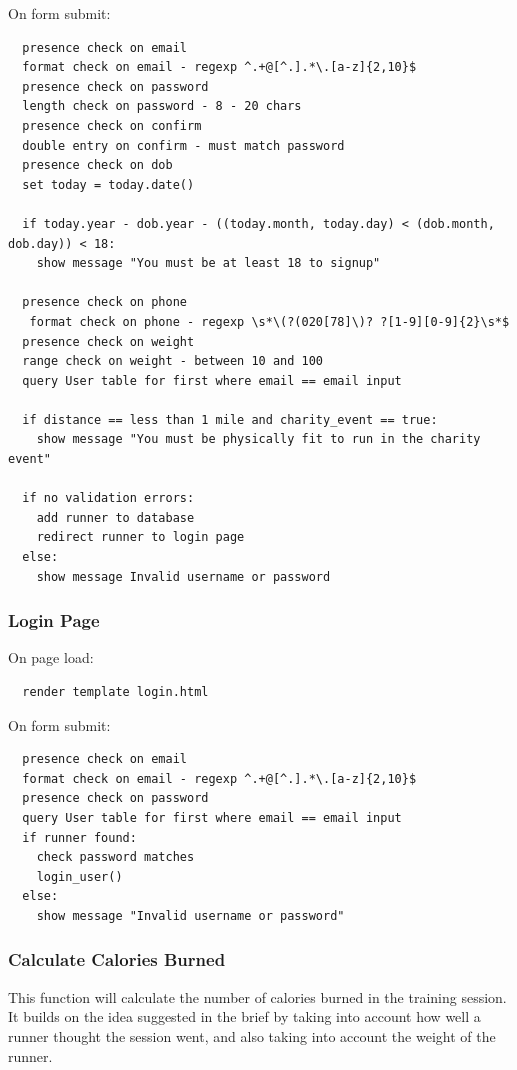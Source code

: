 \documentclass{article}[12pt,a4paper]
\begin{document}
\noindent
On form submit:
\begin{verbatim}
  presence check on email
  format check on email - regexp ^.+@[^.].*\.[a-z]{2,10}$
  presence check on password
  length check on password - 8 - 20 chars
  presence check on confirm
  double entry on confirm - must match password
  presence check on dob
  set today = today.date()

  if today.year - dob.year - ((today.month, today.day) < (dob.month, dob.day)) < 18:
    show message "You must be at least 18 to signup"

  presence check on phone
   format check on phone - regexp \s*\(?(020[78]\)? ?[1-9][0-9]{2}\s*$
  presence check on weight
  range check on weight - between 10 and 100
  query User table for first where email == email input

  if distance == less than 1 mile and charity_event == true:
    show message "You must be physically fit to run in the charity event"

  if no validation errors:
    add runner to database
    redirect runner to login page
  else:
    show message Invalid username or password
\end{verbatim}

\subsubsection{Login Page}
On page load:
\begin{verbatim}
  render template login.html
\end{verbatim}

\noindent
On form submit:
\begin{verbatim}
  presence check on email
  format check on email - regexp ^.+@[^.].*\.[a-z]{2,10}$
  presence check on password
  query User table for first where email == email input
  if runner found:
    check password matches
    login_user()
  else:
    show message "Invalid username or password"
\end{verbatim}

\subsubsection{Calculate Calories Burned}
This function will calculate the number of calories burned in the training session. It builds on the idea suggested in the brief by taking into account how well a runner thought the session went, and also taking into account the weight of the runner.
\end{document}
